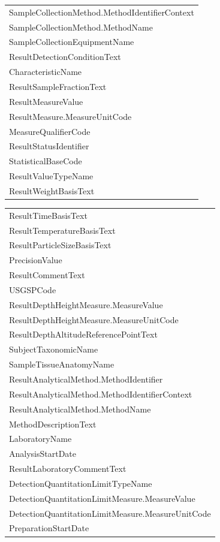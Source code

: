 \documentclass[a4paper,11pt]{article}
\begin{document}
\begin{tabular}{l}
  SampleCollectionMethod.MethodIdentifierContext \\ 
  SampleCollectionMethod.MethodName \\ 
  SampleCollectionEquipmentName \\ 
  ResultDetectionConditionText \\ 
  CharacteristicName \\ 
  ResultSampleFractionText \\ 
  ResultMeasureValue \\ 
  ResultMeasure.MeasureUnitCode \\ 
  MeasureQualifierCode \\ 
  ResultStatusIdentifier \\ 
  StatisticalBaseCode \\ 
  ResultValueTypeName \\ 
  ResultWeightBasisText \\ 
   \hline
\end{tabular}
\FloatBarrier

\begin{tabular}{l}
  \hline
  \hline
ResultTimeBasisText \\ 
  ResultTemperatureBasisText \\ 
  ResultParticleSizeBasisText \\ 
  PrecisionValue \\ 
  ResultCommentText \\ 
  USGSPCode \\ 
  ResultDepthHeightMeasure.MeasureValue \\ 
  ResultDepthHeightMeasure.MeasureUnitCode \\ 
  ResultDepthAltitudeReferencePointText \\ 
  SubjectTaxonomicName \\ 
  SampleTissueAnatomyName \\ 
  ResultAnalyticalMethod.MethodIdentifier \\ 
  ResultAnalyticalMethod.MethodIdentifierContext \\ 
  ResultAnalyticalMethod.MethodName \\ 
  MethodDescriptionText \\ 
  LaboratoryName \\ 
  AnalysisStartDate \\ 
  ResultLaboratoryCommentText \\ 
  DetectionQuantitationLimitTypeName \\ 
  DetectionQuantitationLimitMeasure.MeasureValue \\ 
  DetectionQuantitationLimitMeasure.MeasureUnitCode \\ 
  PreparationStartDate \\ 
   \hline
\end{tabular}
\clearpage
\end{document}
